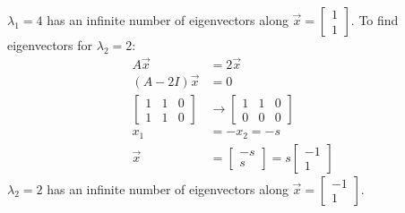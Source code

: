 \documentclass{math}
\begin{document}
\( \lambda_1 = 4 \) has an infinite number of eigenvectors along \( \vec{x} =
\begin{bmatrix}1 \\ 1\end{bmatrix} \). To find eigenvectors for \( \lambda_2 =
2 \):
\begin{align*}
  A\vec{x} &= 2\vec{x} \\
  (A-2I)\vec{x} &= 0 \\
  \begin{bmatrix}
    1 & 1 & 0 \\
    1 & 1 & 0
  \end{bmatrix} &\to \begin{bmatrix}
    1 & 1 & 0 \\
    0 & 0 & 0
  \end{bmatrix} \\
  x_1 &= -x_2 = -s \\
  \vec{x} &= \begin{bmatrix}-s \\ s\end{bmatrix} =
    s\begin{bmatrix}-1 \\ 1\end{bmatrix}
\end{align*}
\( \lambda_2 = 2 \) has an infinite number of eigenvectors along \( \vec{x} =
\begin{bmatrix}-1 \\ 1\end{bmatrix} \).
\end{document}
